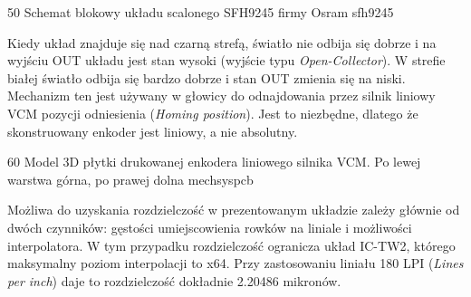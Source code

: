 	{50}
	{Schemat blokowy układu scalonego SFH9245 firmy Osram}
	{sfh9245}

Kiedy układ znajduje się nad czarną strefą, światło nie odbija się dobrze i na wyjściu OUT układu jest stan wysoki (wyjście typu {\it Open-Collector}). W strefie białej światło odbija się bardzo dobrze i stan OUT zmienia się na niski. Mechanizm ten jest używany w głowicy do odnajdowania przez silnik liniowy VCM pozycji odniesienia ({\it Homing position}). Jest to niezbędne, dlatego że skonstruowany enkoder jest liniowy, a nie absolutny.

	{60}
	{Model 3D płytki drukowanej enkodera liniowego silnika VCM. Po lewej warstwa górna, po prawej dolna}
	{mechsyspcb}

Możliwa do uzyskania rozdzielczość w prezentowanym układzie zależy głównie od dwóch czynników: gęstości umiejscowienia rowków na liniale i możliwości interpolatora. W tym przypadku rozdzielczość ogranicza układ IC-TW2, którego maksymalny poziom interpolacji to x64. Przy zastosowaniu liniału 180 LPI ({\it Lines per inch}) daje to rozdzielczość dokładnie 2.20486 mikronów.





\clearpage















